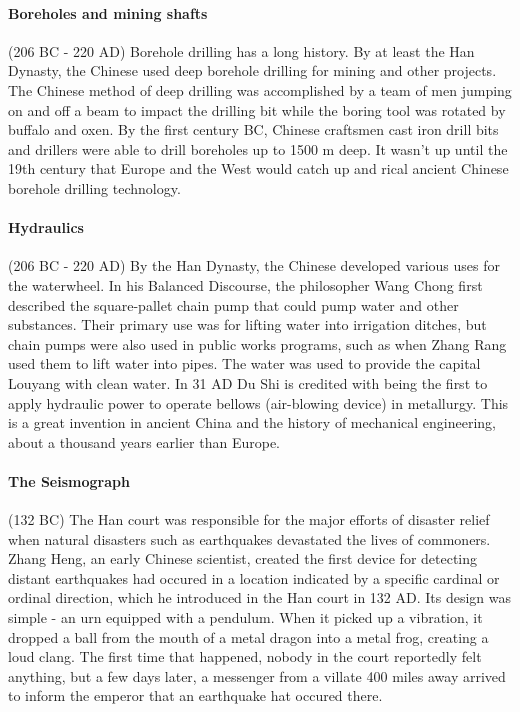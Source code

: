 \paragraph{Boreholes and mining shafts} (206 BC - 220 AD)
Borehole drilling has a long history. By at least the Han Dynasty, the
Chinese used deep borehole drilling for mining and other projects. The Chinese
method of deep drilling was accomplished by a team of men jumping on and off
a beam to impact the drilling bit while the boring tool was rotated by buffalo
and oxen. By the first century BC, Chinese craftsmen cast iron drill bits and
drillers were able to drill boreholes up to 1500 m deep. It wasn't up until
the 19th century that Europe and the West would catch up and rical ancient
Chinese borehole drilling technology.

\paragraph{Hydraulics} (206 BC - 220 AD)
By the Han Dynasty, the Chinese developed various uses for the waterwheel. In
his Balanced Discourse, the philosopher Wang Chong first described the square-pallet
chain pump that could pump water and other substances. Their primary use was for
lifting water into irrigation ditches, but chain pumps were also used in public
works programs, such as when Zhang Rang used them to lift water into pipes.
The water was used to provide the capital Louyang with clean water. In 31 AD
Du Shi is credited with being the first to apply hydraulic power to operate bellows
(air-blowing device) in metallurgy. This is a great invention in ancient China
and the history of mechanical engineering, about a thousand years earlier
than Europe.

\paragraph{The Seismograph} (132 BC)
The Han court was responsible for the major efforts of disaster relief when natural
disasters such as earthquakes devastated the lives of commoners. Zhang Heng, an
early Chinese scientist, created the first device for detecting distant earthquakes
had occured in a location indicated by a specific cardinal or ordinal direction,
which he introduced in the Han court in 132 AD. Its design was simple - an urn
equipped with a pendulum. When it picked up a vibration, it dropped a ball from
the mouth of a metal dragon into a metal frog, creating a loud clang. The first
time that happened, nobody in the court reportedly felt anything, but a few
days later, a messenger from a villate 400 miles away arrived to inform the
emperor that an earthquake hat occured there.

